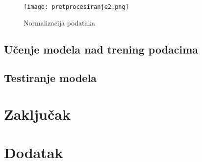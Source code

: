 \documentclass[a4paper]{article}
\begin{document}
\begin{figure}[htp]
    \centering
    \texttt{[image: pretprocesiranje2.png]}
    \caption{Normalizacija podataka}
    \label{fig:Pretprocesiranje2}
\end{figure}



\subsection{Učenje modela nad trening podacima}
\subsection{Testiranje modela}


\section{Zaključak}
\label{sec:zakljucak}


\appendix
 


\appendix
\section{Dodatak}
\end{document}
